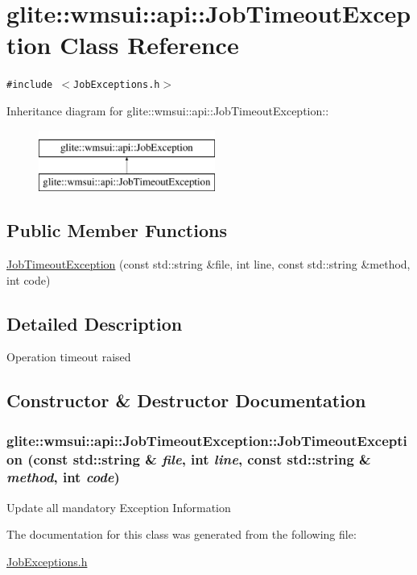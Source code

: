 \hypertarget{classglite_1_1wmsui_1_1api_1_1JobTimeoutException}{
\section{glite::wmsui::api::Job\-Timeout\-Exception Class Reference}
\label{classglite_1_1wmsui_1_1api_1_1JobTimeoutException}
}
{\tt \#include $<$Job\-Exceptions.h$>$}

Inheritance diagram for glite::wmsui::api::Job\-Timeout\-Exception::\begin{figure}[H]
\begin{center}
\leavevmode
\includegraphics[height=2cm]{classglite_1_1wmsui_1_1api_1_1JobTimeoutException}
\end{center}
\end{figure}
\subsection*{Public Member Functions}
\begin{CompactItemize}
\item 
\hyperlink{classglite_1_1wmsui_1_1api_1_1JobTimeoutException_a0}{Job\-Timeout\-Exception} (const std::string \&file, int line, const std::string \&method, int code)
\end{CompactItemize}


\subsection{Detailed Description}
Operation timeout raised 



\subsection{Constructor \& Destructor Documentation}
\hypertarget{classglite_1_1wmsui_1_1api_1_1JobTimeoutException_a0}{
\subsubsection[JobTimeoutException]{\setlength{\rightskip}{0pt plus 5cm}glite::wmsui::api::Job\-Timeout\-Exception::Job\-Timeout\-Exception (const std::string \& {\em file}, int {\em line}, const std::string \& {\em method}, int {\em code})}}
\label{classglite_1_1wmsui_1_1api_1_1JobTimeoutException_a0}


Update all mandatory Exception Information 

The documentation for this class was generated from the following file:\begin{CompactItemize}
\item 
\hyperlink{JobExceptions_8h}{Job\-Exceptions.h}\end{CompactItemize}
